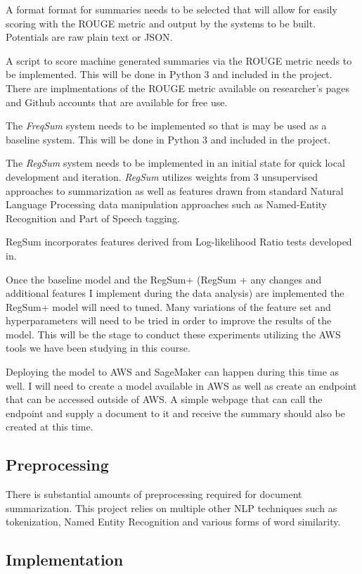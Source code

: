 \documentclass{article}
\begin{document}
A format format for summaries needs to be selected that will allow for easily
scoring with the ROUGE metric and output by the systems to be built. Potentials
are raw plain text or JSON\@.

A script to score machine generated summaries via the ROUGE metric needs to be
implemented. This will be done in Python 3 and included in the project.
There are implmentations of the ROUGE metric available on researcher's pages
and Github accounts that are available for free use.

The \emph{FreqSum} system needs to be implemented so that is may be used as
a baseline system. This will be done in Python 3 and included in the project.

The \emph{RegSum}\cite{RegSum} system needs to be implemented in an initial state for quick local
development and iteration. \emph{RegSum} utilizes weights from 3 unsupervised
approaches to summarization as well as features drawn from standard Natural
Language Processing data manipulation approaches such as Named-Entity
Recognition and Part of Speech tagging.

RegSum incorporates features derived from Log-likelihood Ratio tests developed
in\cite{TPSIG}.

Once the baseline model and the RegSum+ (RegSum + any changes and additional
features I implement during the data analysis) are implemented the RegSum+ model
will need to tuned. Many variations of the feature set and hyperparameters will
need to be tried in order to improve the results of the model. This will be the
stage to conduct these experiments utilizing the AWS tools we have been
studying in this course.

Deploying the model to AWS and SageMaker can happen during this time as well.
I will need to create a model available in AWS as well as create an endpoint
that can be accessed outside of AWS\@. A simple webpage that can call the endpoint
and supply a document to it and receive the summary should also be created at
this time.

\subsection{Preprocessing}
There is substantial amounts of preprocessing required for document
summarization. This project relies on multiple other NLP techniques such as
tokenization, Named Entity Recognition and various forms of word similarity.
\subsection{Implementation}
\end{document}
